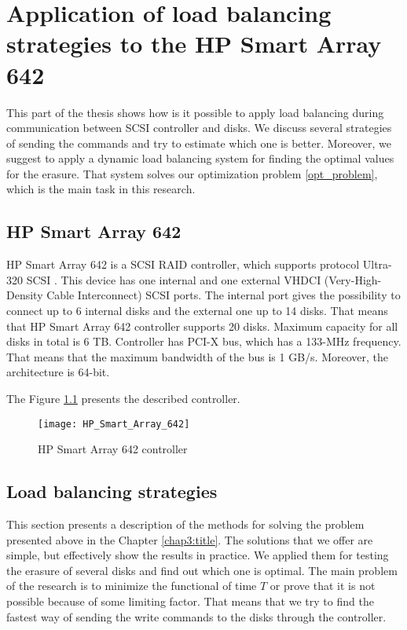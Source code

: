 \chapter{Application of load balancing strategies to the HP Smart Array 642}
\label{chap4:title}

This part of the thesis shows how is it possible to apply load balancing during communication between SCSI controller and disks. We discuss several strategies of sending the commands and try to estimate which one is better. Moreover, we suggest to apply a dynamic load balancing system for finding the optimal values for the erasure. That system solves our optimization problem \ref{opt_problem}, which is the main task in this research.

\section{HP Smart Array 642}
HP Smart Array 642 is a SCSI RAID controller, which supports protocol Ultra-320 SCSI \cite{hp_642_desc}. This device has one internal and one external VHDCI (Very-High-Density Cable Interconnect) SCSI ports. The internal port gives the possibility to connect up to 6 internal disks and the external one up to 14 disks. That means that HP Smart Array 642 controller supports 20 disks. Maximum capacity for all disks in total is 6 TB. Controller has PCI-X bus, which has a 133-MHz frequency. That means that the maximum bandwidth of the bus is 1 GB/s. Moreover, the architecture is 64-bit.

The Figure \ref{fig:HP_Smart_Array_642} presents the described controller.
\begin{figure}[h]
\begin{center}
  \texttt{[image: HP\_Smart\_Array\_642]}
\end{center}
  \caption{HP Smart Array 642 controller}
  \label{fig:HP_Smart_Array_642}
\end{figure}


\section{Load balancing strategies}
\label{subsec:lb_strategies}

This section presents a description of the methods for solving the problem presented above in the Chapter \ref{chap3:title}. The solutions that we offer are simple, but effectively show the results in practice. We applied them for testing the erasure of several disks and find out which one is optimal. The main problem of the research is to minimize the functional of time $T$ or prove that it is not possible because of some limiting factor. That means that we try to find the fastest way of sending the write commands to the disks through the controller.

